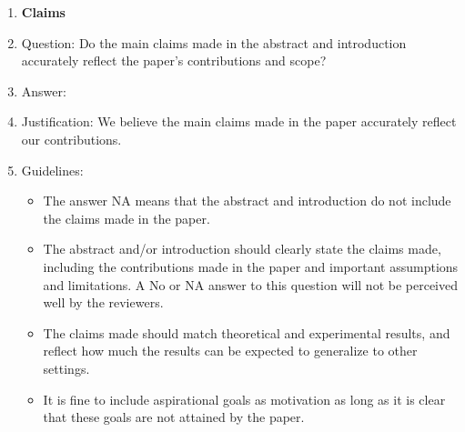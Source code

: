 \documentclass{article}
\theoremstyle{remark}
\begin{document}
 



\begin{enumerate}

\item {\bf Claims}
    \item[] Question: Do the main claims made in the abstract and introduction accurately reflect the paper's contributions and scope?
    \item[] Answer: \answerYes{} %
    \item[] Justification: We believe the main claims made in the paper accurately reflect our contributions.
    \item[] Guidelines:
    \begin{itemize}
        \item The answer NA means that the abstract and introduction do not include the claims made in the paper.
        \item The abstract and/or introduction should clearly state the claims made, including the contributions made in the paper and important assumptions and limitations. A No or NA answer to this question will not be perceived well by the reviewers. 
        \item The claims made should match theoretical and experimental results, and reflect how much the results can be expected to generalize to other settings. 
        \item It is fine to include aspirational goals as motivation as long as it is clear that these goals are not attained by the paper. 
    \end{itemize}


\end{enumerate}
\end{document}
